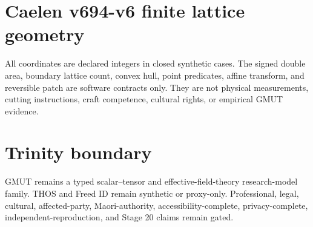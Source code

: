 \documentclass{article}
\begin{document}
\section*{Caelen v694-v6 finite lattice geometry}
All coordinates are declared integers in closed synthetic cases. The signed double area, boundary lattice count, convex hull, point predicates, affine transform, and reversible patch are software contracts only. They are not physical measurements, cutting instructions, craft competence, cultural rights, or empirical GMUT evidence.
\section*{Trinity boundary}
GMUT remains a typed scalar--tensor and effective-field-theory research-model family. THOS and Freed ID remain synthetic or proxy-only. Professional, legal, cultural, affected-party, Maori-authority, accessibility-complete, privacy-complete, independent-reproduction, and Stage 20 claims remain gated.
\end{document}
